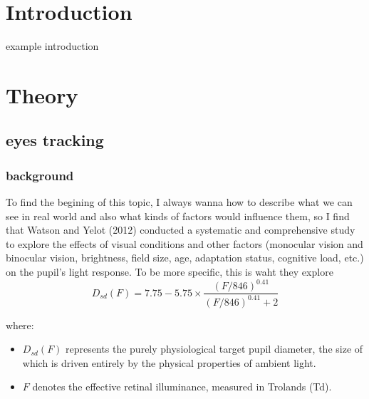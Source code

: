 \documentclass[sigconf, screen]{acmart}
\begin{document}


\maketitle




\section{Introduction}
%
example introduction

\section{Theory}
\subsection{eyes tracking}
\subsubsection{background}
To find the begining of this topic, I always wanna how to describe what we can see in real world
and also what kinds of factors would influence them, so I find that Watson and Yelot (2012) conducted a systematic and comprehensive study to explore the 
effects of visual conditions and other factors (monocular vision and binocular vision, 
brightness, field size, age, adaptation status, cognitive load, etc.) 
on the pupil's light response. To be more specific, this is waht they explore
\begin{equation}
    D_{sd}(F) = 7.75 - 5.75 \times \frac{(F/846)^{0.41}}{(F/846)^{0.41} + 2}
    \label{eq:watson_yellott}
\end{equation}

where:
\begin{itemize}
    \item $D_{sd}(F)$ represents the purely physiological target pupil diameter, the size of which is driven entirely by the physical properties of ambient light.
    \item $F$ denotes the effective retinal illuminance, measured in Trolands (Td).
\end{itemize}
\end{document}
